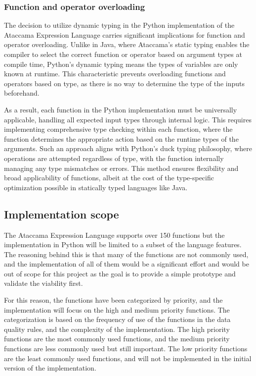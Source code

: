 \subsubsection{Function and operator overloading}

The decision to utilize dynamic typing in the Python implementation of the Ataccama Expression Language carries significant implications for function and operator overloading. Unlike in Java, where Ataccama's static typing enables the compiler to select the correct function or operator based on argument types at compile time, Python's dynamic typing means the types of variables are only known at runtime. This characteristic prevents overloading functions and operators based on type, as there is no way to determine the type of the inputs beforehand.

As a result, each function in the Python implementation must be universally applicable, handling all expected input types through internal logic. This requires implementing comprehensive type checking within each function, where the function determines the appropriate action based on the runtime types of the arguments. Such an approach aligns with Python’s duck typing philosophy, where operations are attempted regardless of type, with the function internally managing any type mismatches or errors. This method ensures flexibility and broad applicability of functions, albeit at the cost of the type-specific optimization possible in statically typed languages like Java.

\subsection{Implementation scope}

The Ataccama Expression Language supports over 150 functions but the implementation in Python will be limited to a subset of
the language features. The reasoning behind this is that many of the functions are
not commonly used, and the implementation of all of them would be a significant
effort and would be out of scope for this project as the goal is to provide a simple
prototype and validate the viability first. 

For this reason, the functions have been categorized by priority, and the implementation will
focus on the high and medium priority functions. The categorization is based on the frequency of use of the functions in the data quality rules, and the complexity of the implementation. The high priority functions are the most commonly used functions, and the medium priority functions are less commonly used but still important. The low priority functions are the least commonly used functions, and will not be implemented in the initial version of the implementation.


